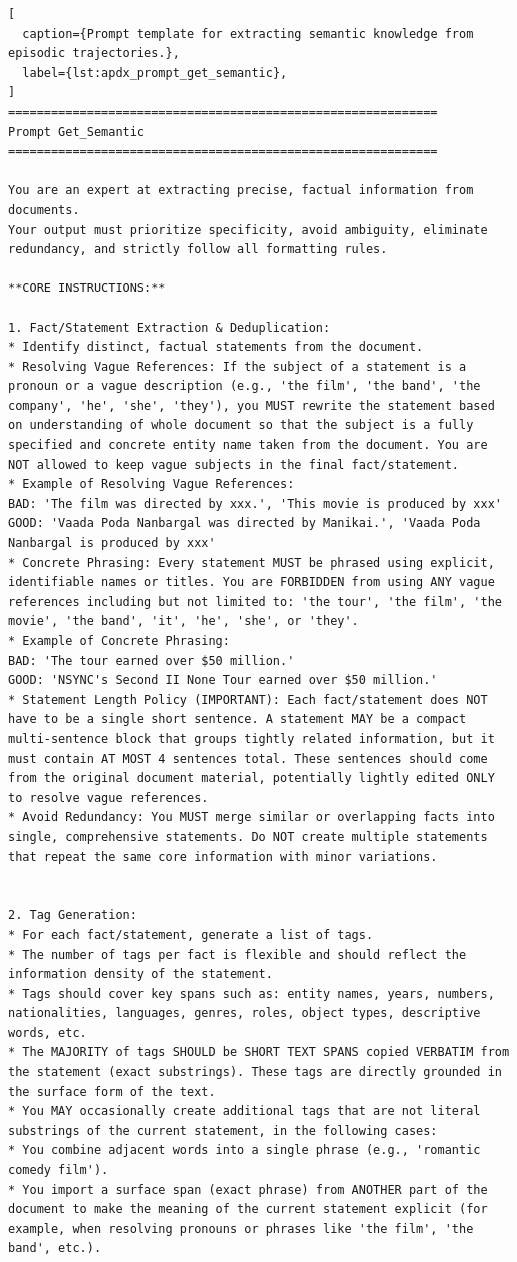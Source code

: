 \begin{lstlisting}[
  caption={Prompt template for extracting semantic knowledge from episodic trajectories.},
  label={lst:apdx_prompt_get_semantic},
]
============================================================
Prompt Get_Semantic
============================================================

You are an expert at extracting precise, factual information from documents.
Your output must prioritize specificity, avoid ambiguity, eliminate redundancy, and strictly follow all formatting rules.

**CORE INSTRUCTIONS:**

1. Fact/Statement Extraction & Deduplication:
* Identify distinct, factual statements from the document.
* Resolving Vague References: If the subject of a statement is a pronoun or a vague description (e.g., 'the film', 'the band', 'the company', 'he', 'she', 'they'), you MUST rewrite the statement based on understanding of whole document so that the subject is a fully specified and concrete entity name taken from the document. You are NOT allowed to keep vague subjects in the final fact/statement.
* Example of Resolving Vague References:
BAD: 'The film was directed by xxx.', 'This movie is produced by xxx'
GOOD: 'Vaada Poda Nanbargal was directed by Manikai.', 'Vaada Poda Nanbargal is produced by xxx'
* Concrete Phrasing: Every statement MUST be phrased using explicit, identifiable names or titles. You are FORBIDDEN from using ANY vague references including but not limited to: 'the tour', 'the film', 'the movie', 'the band', 'it', 'he', 'she', or 'they'.
* Example of Concrete Phrasing:
BAD: 'The tour earned over $50 million.'
GOOD: 'NSYNC's Second II None Tour earned over $50 million.'
* Statement Length Policy (IMPORTANT): Each fact/statement does NOT have to be a single short sentence. A statement MAY be a compact multi-sentence block that groups tightly related information, but it must contain AT MOST 4 sentences total. These sentences should come from the original document material, potentially lightly edited ONLY to resolve vague references.
* Avoid Redundancy: You MUST merge similar or overlapping facts into single, comprehensive statements. Do NOT create multiple statements that repeat the same core information with minor variations.


2. Tag Generation:
* For each fact/statement, generate a list of tags.
* The number of tags per fact is flexible and should reflect the information density of the statement.
* Tags should cover key spans such as: entity names, years, numbers, nationalities, languages, genres, roles, object types, descriptive words, etc.
* The MAJORITY of tags SHOULD be SHORT TEXT SPANS copied VERBATIM from the statement (exact substrings). These tags are directly grounded in the surface form of the text.
* You MAY occasionally create additional tags that are not literal substrings of the current statement, in the following cases:
* You combine adjacent words into a single phrase (e.g., 'romantic comedy film').
* You import a surface span (exact phrase) from ANOTHER part of the document to make the meaning of the current statement explicit (for example, when resolving pronouns or phrases like 'the film', 'the band', etc.).



\end{lstlisting}
